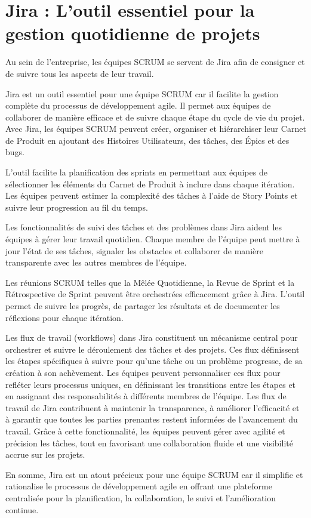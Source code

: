\section[Jira : L'outil essentiel pour la gestion de projets]{Jira : L'outil essentiel pour la gestion quotidienne de projets}\label{sec:jira}

Au sein de l'entreprise, les équipes SCRUM se servent de Jira afin de consigner et de suivre tous les aspects de leur travail.

Jira est un outil essentiel pour une équipe SCRUM car il facilite la gestion complète du processus de développement agile. Il permet aux équipes de collaborer de manière efficace et de suivre chaque étape du cycle de vie du projet. Avec Jira, les équipes SCRUM peuvent créer, organiser et hiérarchiser leur Carnet de Produit en ajoutant des Histoires Utilisateurs, des tâches, des Épics et des bugs.

L'outil facilite la planification des sprints en permettant aux équipes de sélectionner les éléments du Carnet de Produit à inclure dans chaque itération. Les équipes peuvent estimer la complexité des tâches à l'aide de Story Points et suivre leur progression au fil du temps.

Les fonctionnalités de suivi des tâches et des problèmes dans Jira aident les équipes à gérer leur travail quotidien. Chaque membre de l'équipe peut mettre à jour l'état de ses tâches, signaler les obstacles et collaborer de manière transparente avec les autres membres de l'équipe.

Les réunions SCRUM telles que la Mêlée Quotidienne, la Revue de Sprint et la Rétrospective de Sprint peuvent être orchestrées efficacement grâce à Jira. L'outil permet de suivre les progrès, de partager les résultats et de documenter les réflexions pour chaque itération.

Les flux de travail (workflows) dans Jira constituent un mécanisme central pour orchestrer et suivre le déroulement des tâches et des projets. Ces flux définissent les étapes spécifiques à suivre pour qu'une tâche ou un problème progresse, de sa création à son achèvement. Les équipes peuvent personnaliser ces flux pour refléter leurs processus uniques, en définissant les transitions entre les étapes et en assignant des responsabilités à différents membres de l'équipe. Les flux de travail de Jira contribuent à maintenir la transparence, à améliorer l'efficacité et à garantir que toutes les parties prenantes restent informées de l'avancement du travail. Grâce à cette fonctionnalité, les équipes peuvent gérer avec agilité et précision les tâches, tout en favorisant une collaboration fluide et une visibilité accrue sur les projets.

En somme, Jira est un atout précieux pour une équipe SCRUM car il simplifie et rationalise le processus de développement agile en offrant une plateforme centralisée pour la planification, la collaboration, le suivi et l'amélioration continue.